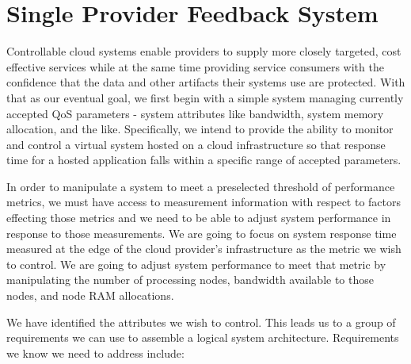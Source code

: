 \documentclass[times, 10pt,twocolumn]{article}
\begin{document}


\section{Single Provider Feedback System}\label{sec:single}
Controllable cloud systems enable providers to supply more closely targeted, cost effective services while at the same time providing service consumers with the confidence that the data and other artifacts their systems use are protected.  With that as our eventual goal, we first begin with a simple system managing currently accepted QoS parameters - system attributes like bandwidth, system memory allocation, and the like.  Specifically, we intend to provide the ability to monitor and control a virtual system hosted on a cloud infrastructure so that response time for a hosted application falls within a specific range of accepted parameters.

In order to manipulate a system to meet a preselected threshold of performance metrics, we must have access to measurement information with respect to factors effecting those metrics and we need to be able to adjust system performance in response to those measurements.  We are going to focus on system response time measured at the edge of the cloud provider's infrastructure as the metric we wish to control.  We are going to adjust system performance to meet that metric by manipulating the number of processing nodes, bandwidth available to those nodes, and node RAM allocations.

We have identified the attributes we wish to control.  This leads us to a group of requirements we can use to assemble a logical system architecture.  Requirements we know we need to address include:
\end{document}
